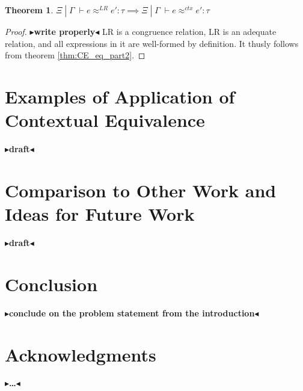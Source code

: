 \documentclass[twoside,11pt,openright]{report}
\newtheorem{theorem}{Theorem}
\theoremstyle{definition}
\newcommand{\expr}{e}
\newcommand{\typ}{\tau}
\newcommand{\venv}{\Gamma}
\newcommand{\tenv}{\Xi}
\newcommand{\jdgRel}[6]{#1 \; | \; #2 \; \vdash #3 \approx^{#4} #5 : #6}
\newcommand{\ctxRel}[5]{\jdgRel{#1}{#2}{#3}{ctx}{#4}{#5}}
\newcommand{\LogRel}[5]{\jdgRel{#1}{#2}{#3}{LR}{#4}{#5}}
\newcommand{\todo}[1]{{\color[rgb]{.5,0,0}\textbf{$\blacktriangleright$#1$\blacktriangleleft$}}}
\begin{document}
\begin{theorem}
  $\LogRel{\tenv}{\venv}{\expr}{\expr'}{\typ} \implies \ctxRel{\tenv}{\venv}{\expr}{\expr'}{\typ}$
\end{theorem}
\begin{proof}
  \todo{write properly}
  LR is a congruence relation, LR is an adequate relation, and all expressions in it are well-formed by definition. It thusly follows from theorem \ref{thm:CE_eq_part2}.
\end{proof}




\chapter{Examples of Application of Contextual Equivalence}
\label{ch:ACE}

\todo{draft}


\chapter{Comparison to Other Work and Ideas for Future Work}
\label{ch:COWFW}

\todo{draft}


\chapter{Conclusion}
\label{ch:conclusion}

\todo{conclude on the problem statement from the introduction}

\chapter*{Acknowledgments}

\todo{\dots}


\cleardoublepage
{}
 


\end{document}
